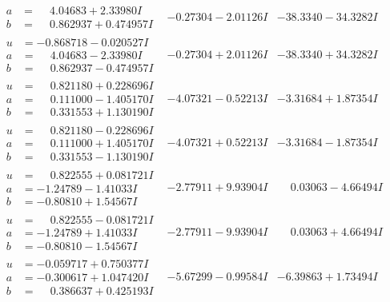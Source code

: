 \documentclass[1p]{elsarticle_modified}
\theoremstyle{definition}
\begin{document}
$$\begin{array}{c|c|c}
\begin{aligned}
a &= \phantom{-}4.04683 + 2.33980 I \\
b &= \phantom{-}0.862937 + 0.474957 I\end{aligned}
 & -0.27304 - 2.01126 I & -38.3340 - 34.3282 I \\ \hline\begin{aligned}
u &= -0.868718 - 0.020527 I \\
a &= \phantom{-}4.04683 - 2.33980 I \\
b &= \phantom{-}0.862937 - 0.474957 I\end{aligned}
 & -0.27304 + 2.01126 I & -38.3340 + 34.3282 I \\ \hline\begin{aligned}
u &= \phantom{-}0.821180 + 0.228696 I \\
a &= \phantom{-}0.111000 - 1.405170 I \\
b &= \phantom{-}0.331553 + 1.130190 I\end{aligned}
 & -4.07321 - 0.52213 I & -3.31684 + 1.87354 I \\ \hline\begin{aligned}
u &= \phantom{-}0.821180 - 0.228696 I \\
a &= \phantom{-}0.111000 + 1.405170 I \\
b &= \phantom{-}0.331553 - 1.130190 I\end{aligned}
 & -4.07321 + 0.52213 I & -3.31684 - 1.87354 I \\ \hline\begin{aligned}
u &= \phantom{-}0.822555 + 0.081721 I \\
a &= -1.24789 - 1.41033 I \\
b &= -0.80810 + 1.54567 I\end{aligned}
 & -2.77911 + 9.93904 I & \phantom{-}0.03063 - 4.66494 I \\ \hline\begin{aligned}
u &= \phantom{-}0.822555 - 0.081721 I \\
a &= -1.24789 + 1.41033 I \\
b &= -0.80810 - 1.54567 I\end{aligned}
 & -2.77911 - 9.93904 I & \phantom{-}0.03063 + 4.66494 I \\ \hline\begin{aligned}
u &= -0.059717 + 0.750377 I \\
a &= -0.300617 + 1.047420 I \\
b &= \phantom{-}0.386637 + 0.425193 I\end{aligned}
 & -5.67299 - 0.99584 I & -6.39863 + 1.73494 I \\ \hline\begin{aligned}

\end{aligned}
\end{array}$$
\end{document}
